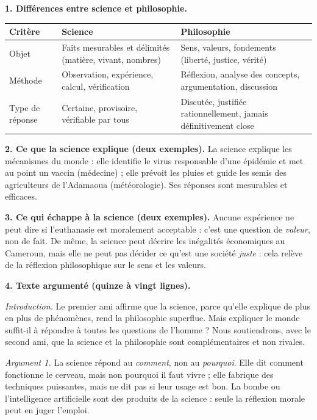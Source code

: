 \documentclass[11pt]{article}
\begin{document}
\begin{corrige}
\textbf{1. Différences entre science et philosophie.}
\begin{center}
\begin{tabularx}{\linewidth}{|l|X|X|}
\hline
\rowcolor{popblueL} \textbf{Critère} & \textbf{Science} & \textbf{Philosophie} \\
\hline
Objet & Faits mesurables et délimités (matière, vivant, nombres) & Sens, valeurs, fondements (liberté, justice, vérité) \\
\hline
Méthode & Observation, expérience, calcul, vérification & Réflexion, analyse des concepts, argumentation, discussion \\
\hline
Type de réponse & Certaine, provisoire, vérifiable par tous & Discutée, justifiée rationnellement, jamais définitivement close \\
\hline
\end{tabularx}
\end{center}

\textbf{2. Ce que la science explique (deux exemples).} La science explique les mécanismes du monde : elle identifie le virus responsable d'une épidémie et met au point un vaccin (médecine) ; elle prévoit les pluies et guide les semis des agriculteurs de l'Adamaoua (météorologie). Ses réponses sont mesurables et efficaces.

\textbf{3. Ce qui échappe à la science (deux exemples).} Aucune expérience ne peut dire si l'euthanasie est moralement acceptable : c'est une question de \emph{valeur}, non de fait. De même, la science peut décrire les inégalités économiques au Cameroun, mais elle ne peut pas décider ce qu'est une société \emph{juste} : cela relève de la réflexion philosophique sur le sens et les valeurs.

\textbf{4. Texte argumenté (quinze à vingt lignes).}

\emph{Introduction.} Le premier ami affirme que la science, parce qu'elle explique de plus en plus de phénomènes, rend la philosophie superflue. Mais expliquer le monde suffit-il à répondre à toutes les questions de l'homme ? Nous soutiendrons, avec le second ami, que la science et la philosophie sont complémentaires et non rivales.

\emph{Argument 1.} La science répond au \emph{comment}, non au \emph{pourquoi}. Elle dit comment fonctionne le cerveau, mais non pourquoi il faut vivre ; elle fabrique des techniques puissantes, mais ne dit pas si leur usage est bon. La bombe ou l'intelligence artificielle sont des produits de la science : seule la réflexion morale peut en juger l'emploi.


\end{corrige}
\end{document}
